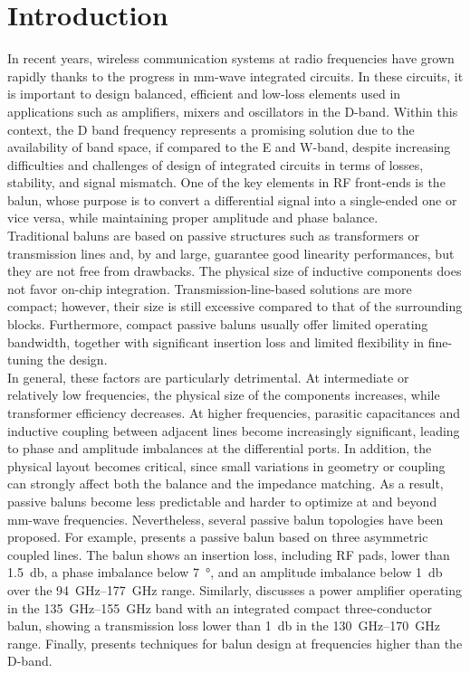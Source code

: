 \section{Introduction}
\label{sec:Introduction}
In recent years, wireless communication systems at radio frequencies have grown rapidly thanks to the progress in mm-wave integrated circuits. In these circuits, it is important to design balanced, efficient and low-loss elements used in applications such as amplifiers, mixers and oscillators in the D-band.
Within this context, the D band frequency represents a promising solution due to the availability of band space, if compared to the E and W-band, despite increasing difficulties and challenges of design of integrated circuits in terms of losses, stability, and signal mismatch.
One of the key elements in RF front-ends is the balun, whose purpose is to convert a differential signal into a single-ended one or vice versa, while maintaining proper amplitude and phase balance.\\
Traditional baluns are based on passive structures such as transformers or transmission lines and, by and large, guarantee good linearity performances, but they are not free from drawbacks.
The physical size of inductive components does not favor on-chip integration.
Transmission-line-based solutions are more compact; however, their size is still excessive compared to that of the surrounding blocks.
Furthermore, compact passive baluns usually offer limited operating bandwidth, together with significant insertion loss and limited
flexibility in fine-tuning the design.\\
In general, these factors are particularly detrimental. At intermediate or relatively low frequencies, the physical size of the components increases, while transformer efficiency decreases.
At higher frequencies, parasitic capacitances and inductive coupling between adjacent lines become
increasingly significant, leading to phase and amplitude imbalances at the differential ports.
In addition, the physical layout becomes critical, since small variations in geometry or coupling can
strongly affect both the balance and the impedance matching. As a result, passive baluns become less predictable and harder to optimize at and beyond mm-wave frequencies. Nevertheless, several passive balun topologies have been proposed. For example, \cite{Ali2019} presents a passive balun based on three asymmetric coupled lines. The balun shows an insertion loss, including RF pads, lower than \SI{1.5}{\decibel}, a phase imbalance below \SI{7}{\degree}, and an amplitude imbalance below \SI{1}{\decibel} over the \SIrange{94}{177}{\giga\hertz} range. Similarly, \cite{Li2023} discusses a power amplifier operating in the \SIrange{135}{155}{\giga\hertz} band with an integrated compact three-conductor balun, showing a transmission loss lower than \SI{1}{\decibel} in the \SIrange{130}{170}{\giga\hertz} range. Finally, \cite{Sakai2021} presents techniques for balun design at frequencies higher than the D-band.

